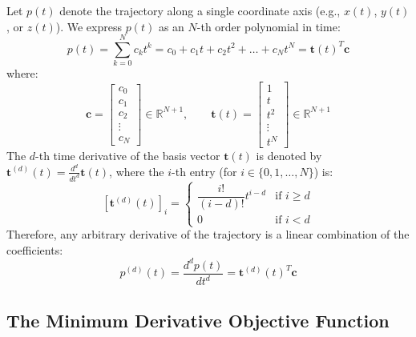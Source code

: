\documentclass[11pt,a4paper]{article}
\begin{document}
Let $p(t)$ denote the trajectory along a single coordinate axis (e.g., $x(t)$, $y(t)$, or $z(t)$). We express $p(t)$ as an $N$-th order polynomial in time:
\begin{equation}
p(t) = \sum_{k=0}^N c_k t^k = c_0 + c_1 t + c_2 t^2 + \dots + c_N t^N = \mathbf{t}(t)^T \mathbf{c}
\end{equation}
where:
\begin{equation}
\mathbf{c} = \begin{bmatrix} c_0 \\ c_1 \\ c_2 \\ \vdots \\ c_N \end{bmatrix} \in \mathbb{R}^{N+1}, \qquad
\mathbf{t}(t) = \begin{bmatrix} 1 \\ t \\ t^2 \\ \vdots \\ t^N \end{bmatrix} \in \mathbb{R}^{N+1}
\end{equation}
The $d$-th time derivative of the basis vector $\mathbf{t}(t)$ is denoted by $\mathbf{t}^{(d)}(t) = \frac{d^d}{dt^d} \mathbf{t}(t)$, where the $i$-th entry (for $i \in \{0, 1, \dots, N\}$) is:
\begin{equation}
\left[\mathbf{t}^{(d)}(t)\right]_i = \begin{cases}
\dfrac{i!}{(i-d)!} t^{i-d} & \text{if } i \ge d \\[0.6em]
0 & \text{if } i < d
\end{cases}
\end{equation}
Therefore, any arbitrary derivative of the trajectory is a linear combination of the coefficients:
\begin{equation}
p^{(d)}(t) = \frac{d^d p(t)}{dt^d} = \mathbf{t}^{(d)}(t)^T \mathbf{c}
\end{equation}

\subsection{The Minimum Derivative Objective Function}
\end{document}
